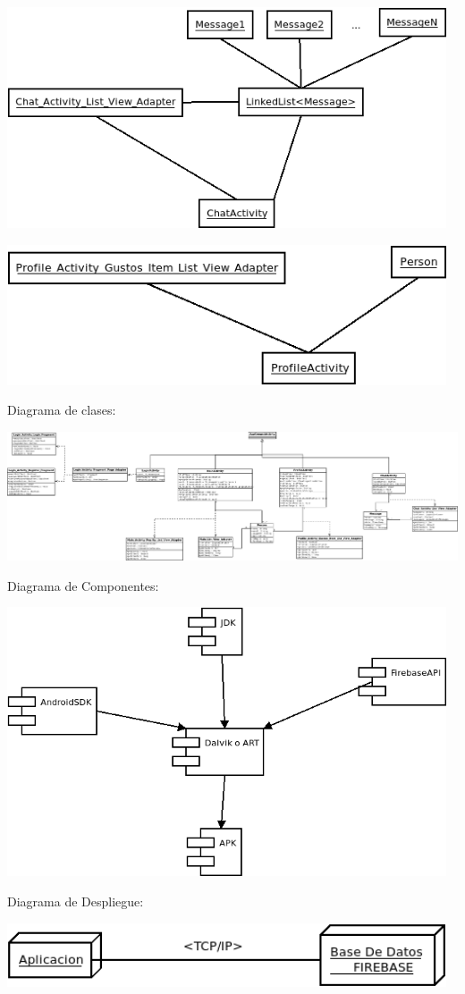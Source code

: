 \includegraphics[width=13cm]{Images/UML/ChatActivityDiagramObject.png}

\includegraphics[width=13cm]{Images/UML/ProfileActivityDiagramObject.png}

Diagrama de clases:

\includegraphics[angle=90,scale=0.25]{Images/UML/Clase.png}

Diagrama de Componentes:

\includegraphics[width=13cm]{Images/UML/Componentes.png}

Diagrama de Despliegue:

\includegraphics[width=13cm]{Images/UML/Despliegue.png}